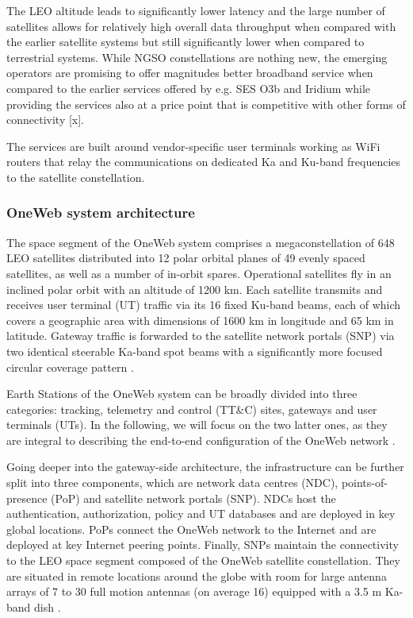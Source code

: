 \documentclass[english, 12pt, a4paper, elec, utf8, a-1b, online]{aaltothesis}
\begin{document}
The LEO altitude leads to significantly lower latency and the large number of satellites allows for relatively high overall data throughput when compared with the earlier satellite systems but still significantly lower when compared to terrestrial systems.
While NGSO constellations are nothing new, the emerging operators are promising to offer magnitudes better broadband service when compared to the earlier services offered by e.g.
SES O3b and Iridium while providing the services also at a price point that is competitive with other forms of connectivity [x].

The services are built around vendor-specific user terminals working as WiFi routers that relay the communications on dedicated Ka and Ku-band frequencies to the satellite constellation.

\subsubsection{OneWeb system architecture}

The space segment of the OneWeb system comprises a megaconstellation of 648 LEO satellites distributed into 12 polar orbital planes of 49 evenly spaced satellites, as well as a number of in-orbit spares. 
Operational satellites fly in an inclined polar orbit with an altitude of 1200 km.
Each satellite transmits and receives user terminal (UT) traffic via its 16 fixed Ku-band beams, each of which covers a geographic area with dimensions of 1600 km in longitude and 65 km in latitude.
Gateway traffic is forwarded to the satellite network portals (SNP) via two identical steerable Ka-band spot beams with a significantly more focused circular coverage pattern \cite{henri2020oneweb, worldvu2016loi}.

Earth Stations of the OneWeb system can be broadly divided into three categories: tracking, telemetry and control (TT\&C) sites,  gateways and user terminals (UTs).
In the following, we will focus on the two latter ones, as they are integral to describing the end-to-end configuration of the OneWeb network \cite{worldvu2016loi}.

Going deeper into the gateway-side architecture, the infrastructure can be further split into three components, which are network data centres (NDC), points-of-presence (PoP) and satellite network portals (SNP).
NDCs host the authentication, authorization, policy and UT databases and are deployed in key global locations.
PoPs connect the OneWeb network to the Internet and are deployed at key Internet peering points.
Finally, SNPs maintain the connectivity to the LEO space segment composed of the OneWeb satellite constellation.
They are situated in remote locations around the globe with room for large antenna arrays of 7 to 30 full motion antennas (on average 16) equipped with a 3.5 m Ka-band dish \cite{henri2020oneweb}.
\end{document}
